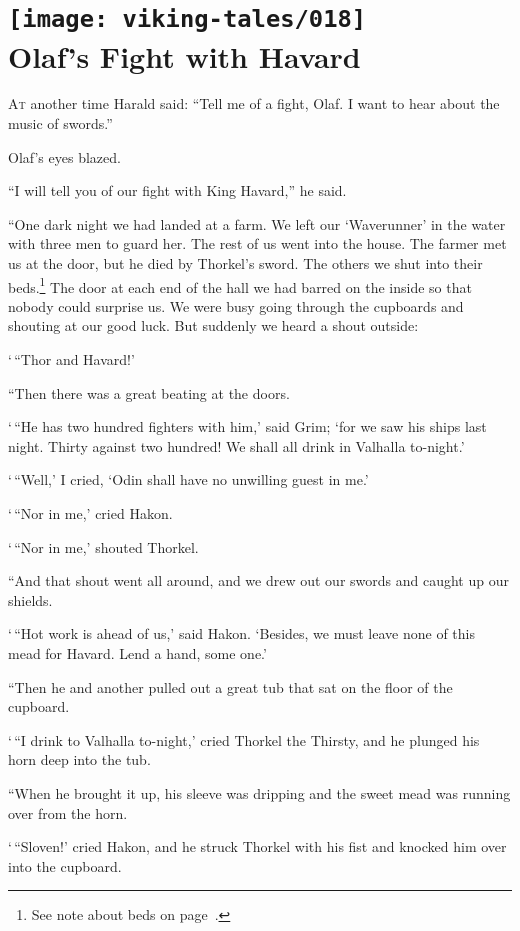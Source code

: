 \chapter[Olaf's Fight with Havard]{
    \texttt{[image: viking-tales/018]}\\
    Olaf's Fight with Havard}

\lettrine{A}{t} another time Harald said:
\baselineskip
``Tell me of a fight, Olaf. I want to hear about the music of swords.''

Olaf's eyes blazed.

``I will tell you of our fight with King Havard,'' he said.

``One dark night we had landed at a farm. We left our `Waverunner' in the
water with three men to guard her. The rest of us went into the house.
The farmer met us at the door, but he died by Thorkel's sword. The
others we shut into their beds.\footnote{See note about beds on
page~\pageref{beds}.} The door at each end of the hall we had barred on
the inside so that nobody could surprise us. We were busy going through
the cupboards and shouting at our good luck. But suddenly we heard a
shout outside:

`\,``Thor and Havard!'

``Then there was a great beating at the doors.

`\,``He has two hundred fighters with him,' said Grim; `for we saw his
ships last night. Thirty against two hundred! We shall all drink in
Valhalla to-night.'

`\,``Well,' I cried, `Odin shall have no unwilling guest in me.'

`\,``Nor in me,' cried Hakon.

`\,``Nor in me,' shouted Thorkel.

``And that shout went all around, and we drew out our swords and caught
up our shields.

`\,``Hot work is ahead of us,' said Hakon. `Besides, we must leave none of
this mead for Havard. Lend a hand, some one.'

``Then he and another pulled out a great tub that sat on the floor of the
cupboard.

`\,``I drink to Valhalla to-night,' cried Thorkel the Thirsty, and he
plunged his horn deep into the tub.

``When he brought it up, his sleeve was dripping and the sweet mead was
running over from the horn.

`\,``Sloven!' cried Hakon, and he struck Thorkel with his fist and knocked
him over into the cupboard.

